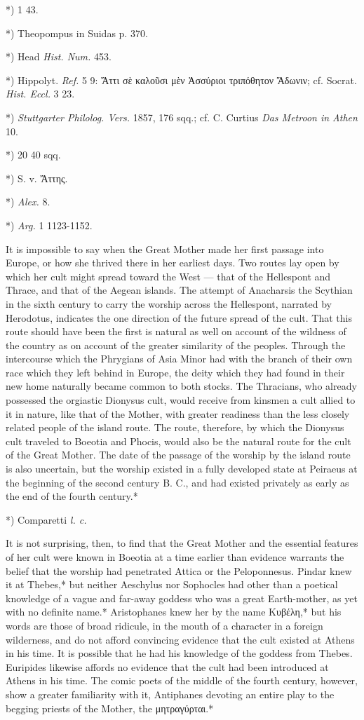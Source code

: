 \documentclass[a4paper, 11pt, oneside, polutonikogreek, english]{article}
\begin{document}
*) 1 43.

*) Theopompus in Suidas p. 370.

*) Head \emph{Hist. Num.} 453.

*) Hippolyt. \emph{Ref.} 5 9: Ἄττι σὲ καλοῦσι μὲν Ἀσσύριοι τριπόθητον Ἄδωνιν; cf. Socrat. \emph{Hist. Eccl.} 3 23.

*) \emph{Stuttgarter Philolog. Vers.} 1857, 176 sqq.; cf. C. Curtius \emph{Das Metroon in Athen} 10.

*) 20 40 sqq.

*) S. v. Ἄττης.

*) \emph{Alex.} 8.

*) \emph{Arg.} 1 1123-1152.

It is impossible to say when the Great Mother made her first passage into Europe, or how she thrived there in her earliest days. Two routes lay open by which her cult might spread toward the West --- that of the Hellespont and Thrace, and that of the Aegean islands. The attempt of Anacharsis the Scythian in the sixth century to carry the worship across the Hellespont, narrated by Herodotus, indicates the one direction of the future spread of the cult. That this route should have been the first is natural as well on account of the wildness of the country as on account of the greater similarity of the peoples. Through the intercourse which the Phrygians of Asia Minor had with the branch of their own race which they left behind in Europe, the deity which they had found in their new home naturally became common to both stocks. The Thracians, who already possessed the orgiastic Dionysus cult, would receive from kinsmen a cult allied to it in nature, like that of the Mother, with greater readiness than the less closely related people of the island route. The route, therefore, by which the Dionysus cult traveled to Boeotia and Phocis, would also be the natural route for the cult of the Great Mother. The date of the passage of the worship by the island route is also uncertain, but the worship existed in a fully developed state at Peiraeus at the beginning of the second century B. C., and had existed privately as early as the end of the fourth century.*

*) Comparetti \emph{l. c.}

It is not surprising, then, to find that the Great Mother and the essential features of her cult were known in Boeotia at a time earlier than evidence warrants the belief that the worship had penetrated Attica or the Peloponnesus. Pindar knew it at Thebes,* but neither Aeschylus nor Sophocles had other than a poetical knowledge of a vague and far-away goddess who was a great Earth-mother, as yet with no definite name.* Aristophanes knew her by the name Κυβέλη,* but his words are those of broad ridicule, in the mouth of a character in a foreign wilderness, and do not afford convincing evidence that the cult existed at Athens in his time. It is possible that he had his knowledge of the goddess from Thebes. Euripides likewise affords no evidence that the cult had been introduced at Athens in his time. The comic poets of the middle of the fourth century, however, show a greater familiarity with it, Antiphanes devoting an entire play to the begging priests of the Mother, the μητραγύρται.*
\end{document}
